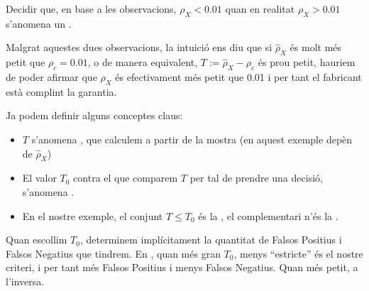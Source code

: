 \documentclass[letterpaper,10pt,english]{sphinxmanual}
\begin{document}
Decidir que, en base a les observacions, \(\rho_X < 0.01\) quan en realitat \(\rho_X > 0.01\) s’anomena un .

Malgrat aquestes dues observacions, la intuició ens diu que si
\(\hat{\rho}_X\) és molt més petit que \(\rho_c = 0.01\),
o de manera equivalent, \(T := \hat{\rho}_X - \rho_c\) és prou
petit, hauriem de poder afirmar que \(\rho_X\) és efectivament
més petit que 0.01 i per tant el fabricant està complint la garantia.

Ja podem definir alguns conceptes claus:
\begin{itemize}
\item {} 
\(T\) s’anomena , que calculem a partir de la mostra (en aquest exemple depèn de \(\hat{\rho}_X\))

\item {} 
El valor \(T_0\) contra el que comparem \(T\) per tal de prendre una decisió, s’anomena .

\item {} 
En el nostre exemple, el conjunt \(T \leq T_0\) és la , el complementari n’és la .

\end{itemize}

Quan escollim \(T_0\), determinem implícitament
la quantitat de Falsos Positius i Falsos Negatius que tindrem. En , quan més gran \(T_0\), menys
“estricte” és el nostre criteri, i per tant més Falsos Positius i menys Falsos Negatius. Quan més petit, a l’inversa.
\end{document}
